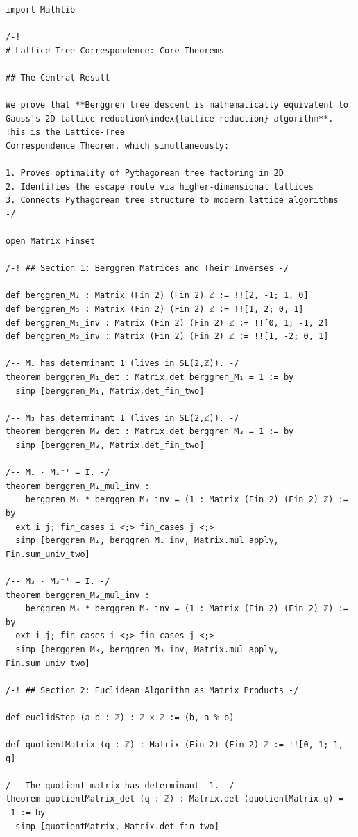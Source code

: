 \documentclass[11pt,openany]{book}
\theoremstyle{definition}
\theoremstyle{plain}
\theoremstyle{remark}
\begin{document}
\begin{lstlisting}[style=lean]
import Mathlib

/-!
# Lattice-Tree Correspondence: Core Theorems

## The Central Result

We prove that **Berggren tree descent is mathematically equivalent to
Gauss's 2D lattice reduction\index{lattice reduction} algorithm**. This is the Lattice-Tree
Correspondence Theorem, which simultaneously:

1. Proves optimality of Pythagorean tree factoring in 2D
2. Identifies the escape route via higher-dimensional lattices
3. Connects Pythagorean tree structure to modern lattice algorithms
-/

open Matrix Finset

/-! ## Section 1: Berggren Matrices and Their Inverses -/

def berggren_M₁ : Matrix (Fin 2) (Fin 2) ℤ := !![2, -1; 1, 0]
def berggren_M₃ : Matrix (Fin 2) (Fin 2) ℤ := !![1, 2; 0, 1]
def berggren_M₁_inv : Matrix (Fin 2) (Fin 2) ℤ := !![0, 1; -1, 2]
def berggren_M₃_inv : Matrix (Fin 2) (Fin 2) ℤ := !![1, -2; 0, 1]

/-- M₁ has determinant 1 (lives in SL(2,ℤ)). -/
theorem berggren_M₁_det : Matrix.det berggren_M₁ = 1 := by
  simp [berggren_M₁, Matrix.det_fin_two]

/-- M₃ has determinant 1 (lives in SL(2,ℤ)). -/
theorem berggren_M₃_det : Matrix.det berggren_M₃ = 1 := by
  simp [berggren_M₃, Matrix.det_fin_two]

/-- M₁ · M₁⁻¹ = I. -/
theorem berggren_M₁_mul_inv :
    berggren_M₁ * berggren_M₁_inv = (1 : Matrix (Fin 2) (Fin 2) ℤ) := by
  ext i j; fin_cases i <;> fin_cases j <;>
  simp [berggren_M₁, berggren_M₁_inv, Matrix.mul_apply, Fin.sum_univ_two]

/-- M₃ · M₃⁻¹ = I. -/
theorem berggren_M₃_mul_inv :
    berggren_M₃ * berggren_M₃_inv = (1 : Matrix (Fin 2) (Fin 2) ℤ) := by
  ext i j; fin_cases i <;> fin_cases j <;>
  simp [berggren_M₃, berggren_M₃_inv, Matrix.mul_apply, Fin.sum_univ_two]

/-! ## Section 2: Euclidean Algorithm as Matrix Products -/

def euclidStep (a b : ℤ) : ℤ × ℤ := (b, a % b)

def quotientMatrix (q : ℤ) : Matrix (Fin 2) (Fin 2) ℤ := !![0, 1; 1, -q]

/-- The quotient matrix has determinant -1. -/
theorem quotientMatrix_det (q : ℤ) : Matrix.det (quotientMatrix q) = -1 := by
  simp [quotientMatrix, Matrix.det_fin_two]


\end{lstlisting}
\end{document}
